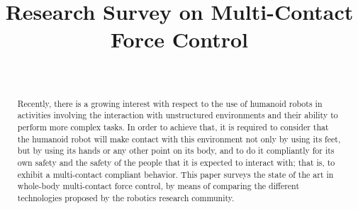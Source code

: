 \documentclass[conference]{IEEEtran}
\begin{document}
	\title{\LARGE \bf Research Survey on Multi-Contact Force Control}

	\author{
		
		 \\
			
		}
  
	\maketitle

	\thispagestyle{empty}
	\pagestyle{empty}
	
	\begin{abstract}
		Recently, there is a growing interest with respect to the use of humanoid robots in activities
		involving the interaction with unstructured environments and their ability to perform more
		complex tasks.
		In order to achieve that, it is required to consider that the humanoid robot will make contact
		with this environment not only by using its feet, but by using its hands or any other point on
		its body, and to do it compliantly for its own safety and the safety of the people that it is
		expected to interact with; that is, to exhibit a multi-contact compliant behavior.
		This paper surveys the state of the art in whole-body multi-contact force control, by means
		of comparing the different technologies proposed by the robotics research	community.
	\end{abstract}
	
	

	
	
	

	
	
	
	
	
	
	
	
	
\end{document}
